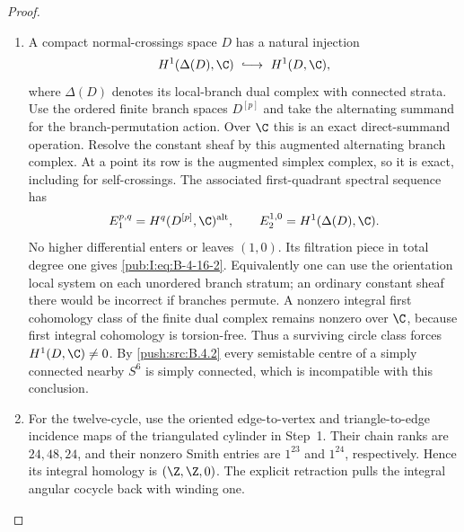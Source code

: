 \begin{proof}
\begin{enumerate}[label=\arabic*.,leftmargin=*]
\item A compact normal-crossings space $D$
has a natural injection
\begin{equation}
 H^1(\Delta(D),\C)\ \lhook\joinrel\longrightarrow\
 H^1(D,\C),
\label{pub:I:eq:B-4-16-2}
\end{equation}
where $\Delta(D)$ denotes its local-branch dual
complex with connected strata. Use the ordered finite
branch spaces $D^{[p]}$ and take the alternating
summand for the branch-permutation action. Over $\C$
this is an exact direct-summand operation. Resolve the
constant sheaf by this augmented alternating branch
complex. At a point its row is the augmented simplex
complex, so it is exact, including for self-crossings.
The associated first-quadrant spectral sequence has
\[
 E_1^{p,q}=H^q(D^{[p]},\C)^{\mathrm{alt}},
 \qquad
 E_2^{1,0}=H^1(\Delta(D),\C).
\]
No higher differential enters or leaves $(1,0)$.
Its filtration piece in total degree one gives
\eqref{pub:I:eq:B-4-16-2}. Equivalently one can use the orientation
local system on each unordered branch stratum; an
ordinary constant sheaf there would be incorrect if
branches permute. A nonzero integral first cohomology
class of the finite dual complex remains nonzero over
$\C$, because first integral cohomology is torsion-free.
Thus a surviving circle class forces $H^1(D,\C)\ne0$.
By \ref{push:src:B.4.2} every semistable centre of
a simply connected nearby $S^6$ is simply connected,
which is incompatible with this conclusion.

\item For the twelve-cycle, use the oriented edge-to-vertex and
triangle-to-edge incidence maps of the triangulated cylinder in Step~1.
Their chain ranks are $24,48,24$, and their nonzero Smith entries are
$1^{23}$ and $1^{24}$, respectively. Hence its integral homology is
$(\Z,\Z,0)$. The explicit retraction pulls the integral angular cocycle
back with winding one.
\end{enumerate}
\end{proof}
